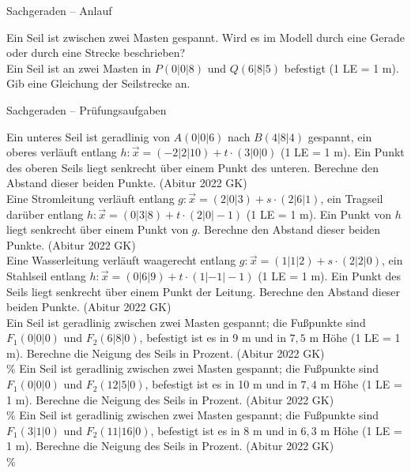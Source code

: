 \begin{aufgabe}{Sachgeraden – Anlauf}
\begin{teile}
\teil Ein Seil ist zwischen zwei Masten gespannt. Wird es im Modell durch eine Gerade oder durch eine Strecke beschrieben?  \\ 
\teil Ein Seil ist an zwei Masten in $P(0 | 0 | 8)$ und $Q(6 | 8 | 5)$ befestigt (1 LE = 1 m). Gib eine Gleichung der Seilstrecke an.
\end{teile}
\end{aufgabe}

\begin{aufgabe}{Sachgeraden – Prüfungsaufgaben}
\begin{teile}
\teil Ein unteres Seil ist geradlinig von $A(0 | 0 | 6)$ nach $B(4 | 8 | 4)$ gespannt, ein oberes verläuft entlang $h\colon \vec x = (-2 | 2 | 10) + t \cdot (3 | 0 | 0)$ (1 LE = 1 m). Ein Punkt des oberen Seils liegt senkrecht über einem Punkt des unteren. Berechne den Abstand dieser beiden Punkte. \hfill (Abitur 2022 GK) \\ \leerfeld[m]
\teil Eine Stromleitung verläuft entlang $g\colon \vec x = (2 | 0 | 3) + s \cdot (2 | 6 | 1)$, ein Tragseil darüber entlang $h\colon \vec x = (0 | 3 | 8) + t \cdot (2 | 0 | -1)$ (1 LE = 1 m). Ein Punkt von $h$ liegt senkrecht über einem Punkt von $g$. Berechne den Abstand dieser beiden Punkte. \hfill (Abitur 2022 GK) \\ \leerfeld[m]
\teil Eine Wasserleitung verläuft waagerecht entlang $g\colon \vec x = (1 | 1 | 2) + s \cdot (2 | 2 | 0)$, ein Stahlseil entlang $h\colon \vec x = (0 | 6 | 9) + t \cdot (1 | -1 | -1)$ (1 LE = 1 m). Ein Punkt des Seils liegt senkrecht über einem Punkt der Leitung. Berechne den Abstand dieser beiden Punkte. \hfill (Abitur 2022 GK) \\ \leerfeld[m]
\teil Ein Seil ist geradlinig zwischen zwei Masten gespannt; die Fußpunkte sind $F_1(0 | 0 | 0)$ und $F_2(6 | 8 | 0)$, befestigt ist es in 9 m und in $7{,}5$ m Höhe (1 LE = 1 m). Berechne die Neigung des Seils in Prozent. \hfill (Abitur 2022 GK) \\ \leerfeld \%
\teil Ein Seil ist geradlinig zwischen zwei Masten gespannt; die Fußpunkte sind $F_1(0 | 0 | 0)$ und $F_2(12 | 5 | 0)$, befestigt ist es in 10 m und in $7{,}4$ m Höhe (1 LE = 1 m). Berechne die Neigung des Seils in Prozent. \hfill (Abitur 2022 GK) \\ \leerfeld \%
\teil Ein Seil ist geradlinig zwischen zwei Masten gespannt; die Fußpunkte sind $F_1(3 | 1 | 0)$ und $F_2(11 | 16 | 0)$, befestigt ist es in 8 m und in $6{,}3$ m Höhe (1 LE = 1 m). Berechne die Neigung des Seils in Prozent. \hfill (Abitur 2022 GK) \\ \leerfeld \%

\end{teile}
\end{aufgabe}
